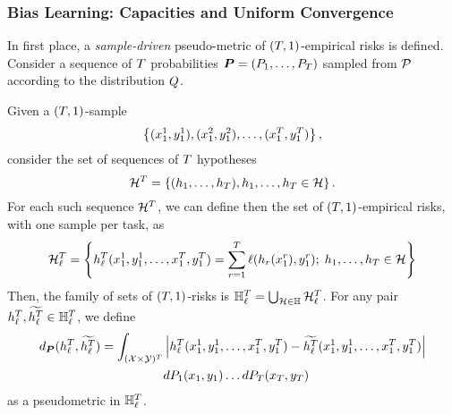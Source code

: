\subsubsection*{Bias Learning: Capacities and Uniform Convergence}
In first place, a \emph{sample-driven} pseudo-metric of $(T, 1)$-empirical risks is defined.
Consider a sequence of $T$ probabilities $\bm{P} = (P_1, \ldots, P_T)$ sampled from $\mathcal{P}$ according to the distribution $Q$. 
\begin{definition}
    \label{def:sample_pseudometric}
    Given a $(T, 1)$-sample 
    $$\left\{(x_1^1, y_1^1), (x_1^2, y_1^2), \ldots, (x_1^T, y_1^T) \right\},$$
    consider the set of sequences of $T$ hypotheses 
$$\mathcal{H}^T = \left\{ (h_1, \ldots, h_T) , h_1, \ldots, h_T \in \mathcal{H}\right\} .$$
For each such sequence $\mathcal{H}^T$, we can define then the set of $(T, 1)$-empirical risks, with one sample per task, as 
$$\mathcal{H}^T_\ell = \left\{ {h}^T_\ell(x_1^1, y_1^1, \ldots, x_1^T, y_1^T) = \sum_{r=1}^T \ell(h_r(x_1^r), y_1^r) ;\;  h_1, \ldots, h_T \in \mathcal{H}\right\} $$
Then, the family of sets of $(T, 1)$-risks is $\mathbb{H}^{T}_\ell = \bigcup_{\mathcal{H} \in \mathbb{H}} \mathcal{H}^T_\ell$. 
For any pair ${h}^T_\ell, \widetilde{h^T_\ell} \in \mathbb{H}_\ell^T$, we define
\begin{equation}
    \nonumber
    \begin{aligned}
        d_{\bm{P}}({h}^T_\ell, \widetilde{h^T_\ell}) = \int_{(\mathcal{X} \times \mathcal{Y})^{T}} &\left|{h}^T_\ell(x_1^1, y_1^1, \ldots, x_1^T, y_1^T) - \widetilde{h^T_\ell} (x_1^1, y_1^1, \ldots, x_1^T, y_1^T)\right| \\ 
        & d{P_1}(x_1, y_1) \ldots d{P_T}(x_T, y_T)
    \end{aligned}
\end{equation}
as a pseudometric in $\mathbb{H}_\ell^T$.
\end{definition}
%

